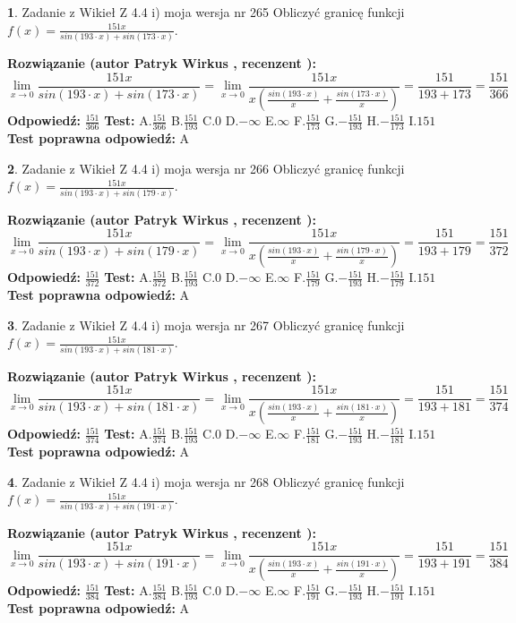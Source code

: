 \documentclass[12pt, a4paper]{article}
\theoremstyle{definition} %
\newtheorem{zad}{}
\newcommand{\zadStart}[1]{\begin{zad}#1\newline}
\newcommand{\zadStop}{\end{zad}}
\newcommand{\rozwStart}[2]{\noindent \textbf{Rozwiązanie (autor #1 , recenzent #2): }\newline}
\newcommand{\rozwStop}{\newline}
\newcommand{\odpStart}{\noindent \textbf{Odpowiedź:}\newline}
\newcommand{\odpStop}{\newline}
\newcommand{\testStart}{\noindent \textbf{Test:}\newline}
\newcommand{\testStop}{\newline}
\newcommand{\kluczStart}{\noindent \textbf{Test poprawna odpowiedź:}\newline}
\newcommand{\kluczStop}{\newline}
\begin{document}
\zadStart{Zadanie z Wikieł Z 4.4 i) moja wersja nr 265}
Obliczyć granicę funkcji $f(x)=\frac{151x}{sin(193\cdot x) +sin(173\cdot x)}$.
\zadStop
\rozwStart{Patryk Wirkus}{}
$$\lim\limits_{x\to 0}\frac{151x}{sin(193\cdot x) +sin(173\cdot x)}=\lim\limits_{x\to 0}\frac{151x}{x(\frac{sin(193\cdot x)}{x}+\frac{sin(173\cdot x)}{x})}=\frac{151}{193+173} = \frac{151}{366}$$
\rozwStop
\odpStart
$\frac{151}{366}$
\odpStop
\testStart
A.$\frac{151}{366}$
B.$\frac{151}{193}$
C.$0$
D.$-\infty$
E.$\infty$
F.$\frac{151}{173}$
G.$-\frac{151}{193}$
H.$-\frac{151}{173}$
I.$151$
\testStop
\kluczStart
A
\kluczStop



\zadStart{Zadanie z Wikieł Z 4.4 i) moja wersja nr 266}
Obliczyć granicę funkcji $f(x)=\frac{151x}{sin(193\cdot x) +sin(179\cdot x)}$.
\zadStop
\rozwStart{Patryk Wirkus}{}
$$\lim\limits_{x\to 0}\frac{151x}{sin(193\cdot x) +sin(179\cdot x)}=\lim\limits_{x\to 0}\frac{151x}{x(\frac{sin(193\cdot x)}{x}+\frac{sin(179\cdot x)}{x})}=\frac{151}{193+179} = \frac{151}{372}$$
\rozwStop
\odpStart
$\frac{151}{372}$
\odpStop
\testStart
A.$\frac{151}{372}$
B.$\frac{151}{193}$
C.$0$
D.$-\infty$
E.$\infty$
F.$\frac{151}{179}$
G.$-\frac{151}{193}$
H.$-\frac{151}{179}$
I.$151$
\testStop
\kluczStart
A
\kluczStop



\zadStart{Zadanie z Wikieł Z 4.4 i) moja wersja nr 267}
Obliczyć granicę funkcji $f(x)=\frac{151x}{sin(193\cdot x) +sin(181\cdot x)}$.
\zadStop
\rozwStart{Patryk Wirkus}{}
$$\lim\limits_{x\to 0}\frac{151x}{sin(193\cdot x) +sin(181\cdot x)}=\lim\limits_{x\to 0}\frac{151x}{x(\frac{sin(193\cdot x)}{x}+\frac{sin(181\cdot x)}{x})}=\frac{151}{193+181} = \frac{151}{374}$$
\rozwStop
\odpStart
$\frac{151}{374}$
\odpStop
\testStart
A.$\frac{151}{374}$
B.$\frac{151}{193}$
C.$0$
D.$-\infty$
E.$\infty$
F.$\frac{151}{181}$
G.$-\frac{151}{193}$
H.$-\frac{151}{181}$
I.$151$
\testStop
\kluczStart
A
\kluczStop



\zadStart{Zadanie z Wikieł Z 4.4 i) moja wersja nr 268}
Obliczyć granicę funkcji $f(x)=\frac{151x}{sin(193\cdot x) +sin(191\cdot x)}$.
\zadStop
\rozwStart{Patryk Wirkus}{}
$$\lim\limits_{x\to 0}\frac{151x}{sin(193\cdot x) +sin(191\cdot x)}=\lim\limits_{x\to 0}\frac{151x}{x(\frac{sin(193\cdot x)}{x}+\frac{sin(191\cdot x)}{x})}=\frac{151}{193+191} = \frac{151}{384}$$
\rozwStop
\odpStart
$\frac{151}{384}$
\odpStop
\testStart
A.$\frac{151}{384}$
B.$\frac{151}{193}$
C.$0$
D.$-\infty$
E.$\infty$
F.$\frac{151}{191}$
G.$-\frac{151}{193}$
H.$-\frac{151}{191}$
I.$151$
\testStop
\kluczStart
A
\kluczStop
\end{document}
